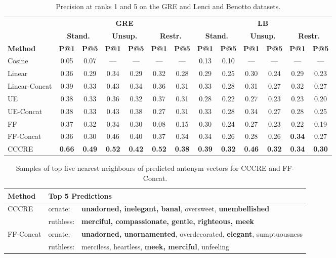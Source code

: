 \documentclass[11pt]{article}
\begin{document}
\begin{table}[t!]
\centering
\small
\begin{tabular}{lcc|cc|cc||cc|cc|cc}
& \multicolumn{6}{c||}{\bf GRE} & \multicolumn{6}{c}{\bf LB} \\
& \multicolumn{2}{c|}{\bf Stand.} & \multicolumn{2}{c|}{\bf Unsup.} & \multicolumn{2}{c||}{\bf Restr.} & \multicolumn{2}{c|}{\bf Stand.} & \multicolumn{2}{c|}{\bf Unsup.} & \multicolumn{2}{c}{\bf Restr.} \\
\bf Method & \bf P@1 & \bf P@5  & \bf P@1 & \bf P@5  & \bf P@1 & \bf P@5  & \bf P@1 & \bf P@5  & \bf P@1 & \bf P@5  & \bf P@1 & \bf P@5  \\
\hline
\hline
Cosine & 0.05 & 0.07 & --- & --- & --- & --- & 0.13 & 0.10 & --- & --- & --- & --- \\
\hline
Linear & 0.36 & 0.29 & 0.34 & 0.29 & 0.32 & 0.28 & 0.29 & 0.25 & 0.30 & 0.24 & 0.29 & 0.23 \\
Linear-Concat & 0.39 & 0.33 & 0.43 & 0.34 & 0.36 & 0.31 & 0.33 & 0.28 & 0.31 & 0.27 & 0.32 & 0.27 \\
\hline
UE & 0.38 & 0.33 & 0.36 & 0.32 & 0.37 & 0.31 & 0.28  & 0.22 & 0.27 & 0.23 & 0.23 & 0.20 \\
UE-Concat & 0.38 & 0.33 & 0.43 & 0.38 & 0.27 & 0.31 & 0.33 & 0.28 & 0.34 & 0.27 & 0.28 & 0.25 \\
FF & 0.37 & 0.32 & 0.34 & 0.30 & 0.08 & 0.15 & 0.30 & 0.24 & 0.27 & 0.23 & 0.22 & 0.19 \\
FF-Concat & 0.36 & 0.30 & 0.46 & 0.40 & 0.37 & 0.34 & 0.34 &  0.26 & 0.28 & 0.26 & \bf 0.34 & 0.27 \\
\hline
CCCRE  & \bf 0.66 & \bf 0.49 & \bf 0.52 & \bf 0.42 & \bf 0.52 & \bf 0.38 & \bf 0.39 & \bf 0.32 & \bf 0.46 & \bf 0.32 & \bf 0.34 & \bf 0.30 \\
\end{tabular} 
\caption{Precision at ranks 1 and 5 on the GRE and Lenci and Benotto datasets.}
\label{t:prec}
\end{table}

\begin{table}
\small
\centering
\begin{tabular}{lll}
\bf Method & \multicolumn{2}{l}{\bf Top 5 Predictions} \\
\hline
\hline
CCCRE & ornate: & {\bf unadorned, inelegant, banal}, oversweet, {\bf unembellished} \\
      & ruthless: & {\bf merciful, compassionate, gentle, righteous, meek} \\
\hline
FF-Concat & ornate: & {\bf unadorned, unornamented}, overdecorated, {\bf elegant}, sumptuousness \\
          & ruthless:&  merciless, heartless, {\bf meek, merciful}, unfeeling \\
\end{tabular}
\caption{Samples of top five nearest neighbours of predicted antonym vectors for CCCRE and FF-Concat.}
\label{t:top5}
\end{table}
\end{document}
